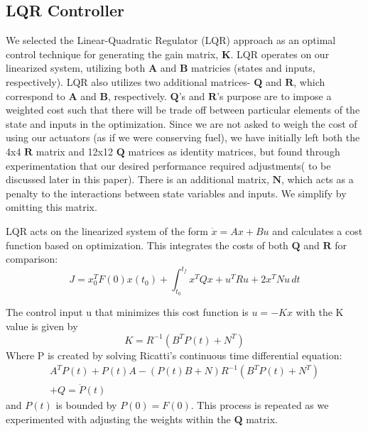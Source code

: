\documentclass{article}
\begin{document}
\begin{multicols}{2}
\section*{LQR Controller}
We selected the Linear-Quadratic Regulator (LQR) approach as an optimal control technique for generating the gain matrix, $
\boldsymbol{K}$.  LQR operates on our linearized system, utilizing both $\boldsymbol{A}$ and $\boldsymbol{B}$ matricies (states 
and inputs, respectively). LQR also utilizes two additional matrices- $\boldsymbol{Q}$ and $\boldsymbol{R}$, which correspond to $
\boldsymbol{A}$ and $\boldsymbol{B}$, respectively. $\boldsymbol{Q}$'s and $\boldsymbol{R}$'s purpose are to impose a weighted 
cost such that there will be trade off between particular elements of the state and inputs in the optimization. Since we are not asked 
to weigh the cost of using our actuators (as if we were conserving fuel), we have initially left both the  4x4 $\boldsymbol{R}$ matrix 
and 12x12 $\boldsymbol{Q}$ matrices as identity matrices, but found through experimentation that our 
desired performance required adjustments( to be discussed later in this paper). There is an additional matrix, $\boldsymbol{N}$, 
which acts as a penalty to the interactions between state variables and inputs.  We simplify by omitting this matrix.

LQR acts on the linearized system of the form $\dot{x} = Ax + Bu$ and calculates a cost function based on optimization.  This 
integrates the costs of both $\boldsymbol{Q}$ and $\boldsymbol{R}$ for comparison:
\begin{equation}
J =x_0^TF(0)x(t_0) +  \int_{t_0}^{t_f} x^TQx+u^TRu +2x^TNu\,dt 
\end{equation}

The control input u that minimizes this cost function is $u= -Kx$ with the K value is given by
\begin{equation}
K = R^{-1}(B^TP(t) + N^T)
\end{equation}
\noindent
Where P is created by solving Ricatti's continuous time differential equation:
\begin{align}
A^TP(t) + P(t)A - (P(t)B + N)R^{-1}(B^TP(t) + N^T) \nonumber\\+ Q = \dot{P}(t)
\end{align}
\noindent
and $P(t)$ is bounded by $P(0) = F(0)$. This process is repeated as we experimented with adjusting the weights within the $
\boldsymbol{Q}$ matrix.


\end{multicols}
\end{document}
